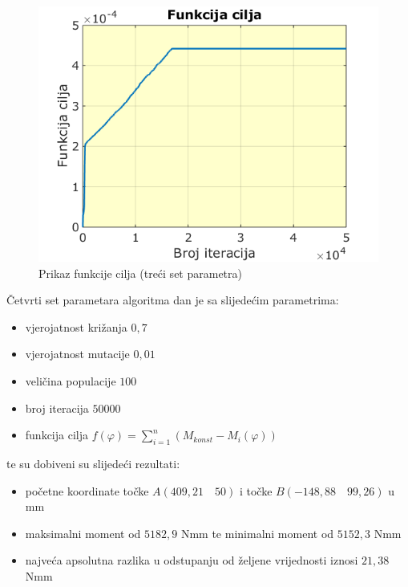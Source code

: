 \begin{figure}[h!]
\center
\includegraphics[scale=.6]{slike/sum_f1.png}
\caption{Prikaz funkcije cilja (treći set parametra)}
\label{fig:sum_f1}
\end{figure}



\quad Četvrti set parametara algoritma dan je sa slijedećim parametrima: 
\begin{itemize}
\item vjerojatnost križanja $0,7$
\item vjerojatnost mutacije $0,01$
\item veličina populacije $100$
\item broj iteracija $50000$
\item funkcija cilja $f(\varphi)=\sum_{i=1}^{n}\left( M_{konst}-M_i(\varphi) \right)$
\end{itemize}
te su dobiveni su slijedeći rezultati:
\begin{itemize}
\item početne koordinate točke $A(409,21\quad 50)$ i točke $B(-148,88\quad  99,26)$ u mm
\item maksimalni moment od $5182,9$ Nmm te minimalni moment od $5152,3$  Nmm
\item najveća apsolutna razlika u odstupanju od željene vrijednosti iznosi $21,38$ Nmm
\end{itemize}



